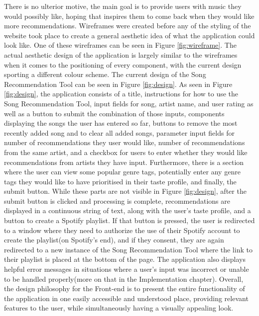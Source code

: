 \documentclass{l4proj}
\begin{document}
There is no ulterior motive, the main goal is to provide users with music they would possibly like, hoping that inspires them to come back when they would like more recommendations. Wireframes were created before any of the styling of the website took place to create a general aesthetic idea of what the application could look like. One of these wireframes can be seen in Figure \ref{fig:wireframe}. The actual aesthetic design of the application is largely similar to the wireframes when it comes to the positioning of every component, with the current design sporting a different colour scheme. The current design of the Song Recommendation Tool can be seen in Figure \ref{fig:design}. As seen in Figure \ref{fig:design}, the application consists of a title, instructions for how to use the Song Recommendation Tool, input fields for song, artist name, and user rating as well as a button to submit the combination of those inputs, components displaying the songs the user has entered so far, buttons to remove the most recently added song and to clear all added songs, parameter input fields for number of recommendations they user would like, number of recommendations from the same artist, and a checkbox for users to enter whether they would like recommendations from artists they have input. Furthermore, there is a section where the user can view some popular genre tags, potentially enter any genre tags they would like to have prioritised in their taste profile, and finally, the submit button. While these parts are not visible in Figure \ref{fig:design}, after the submit button is clicked and processing is complete, recommendations are displayed in a continuous string of text, along with the user's taste profile, and a button to create a Spotify playlist. If that button is pressed, the user is redirected to a window where they need to authorize the use of their Spotify account to create the playlist(on Spotify's end), and if they consent, they are again redirected to a new instance of the Song Recommendation Tool where the link to their playlist is placed at the bottom of the page. The application also displays helpful error messages in situations where a user's input was incorrect or unable to be handled properly(more on that in the Implementation chapter). Overall, the design philosophy for the Front-end is to present the entire functionality of the application in one easily accessible and understood place, providing relevant features to the user, while simultaneously having a visually appealing look. 
\end{document}
